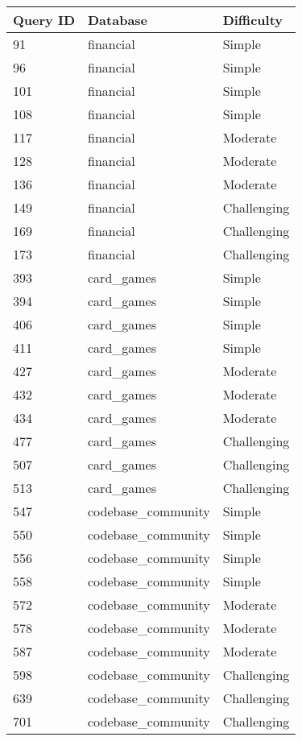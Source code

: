 \documentclass[11pt]{article}
\begin{document}
\begin{longtable}{l l l}
\toprule
Query ID & Database & Difficulty \\
\midrule
91   & financial            & Simple \\
96   & financial            & Simple \\
101  & financial            & Simple \\
108  & financial            & Simple \\
117  & financial            & Moderate \\
128  & financial            & Moderate \\
136  & financial            & Moderate \\
149  & financial            & Challenging \\
169  & financial            & Challenging \\
173  & financial            & Challenging \\
393  & card\_games          & Simple \\
394  & card\_games          & Simple \\
406  & card\_games          & Simple \\
411  & card\_games          & Simple \\
427  & card\_games          & Moderate \\
432  & card\_games          & Moderate \\
434  & card\_games          & Moderate \\
477  & card\_games          & Challenging \\
507  & card\_games          & Challenging \\
513  & card\_games          & Challenging \\
547  & codebase\_community  & Simple \\
550  & codebase\_community  & Simple \\
556  & codebase\_community  & Simple \\
558  & codebase\_community  & Simple \\
572  & codebase\_community  & Moderate \\
578  & codebase\_community  & Moderate \\
587  & codebase\_community  & Moderate \\
598  & codebase\_community  & Challenging \\
639  & codebase\_community  & Challenging \\
701  & codebase\_community  & Challenging \\

\end{longtable}
\end{document}
